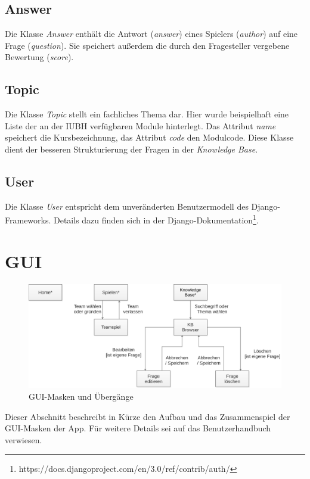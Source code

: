 \documentclass[a4paper,11pt,listof=numbered,glossary=totoc,parskip=half,toc=bib]{scrreprt}
\begin{document}
	\subsection{Answer}
	Die Klasse \textit{Answer} enthält die Antwort (\textit{answer}) eines Spielers (\textit{author}) auf eine Frage (\textit{question}). Sie speichert außerdem die durch den Fragesteller vergebene Bewertung (\textit{score}).
	
	\subsection{Topic}
	Die Klasse \textit{Topic} stellt ein fachliches Thema dar. Hier wurde beispielhaft eine Liste der an der IUBH verfügbaren Module hinterlegt. Das Attribut \textit{name} speichert die Kursbezeichnung, das Attribut \textit{code} den Modulcode. Diese Klasse dient der besseren Strukturierung der Fragen in der \textit{Knowledge Base}.

	\subsection{User}
	Die Klasse \textit{User} entspricht dem unveränderten Benutzermodell des Django-Frameworks. Details dazu finden sich in der Django-Dokumentation\footnote{https://docs.djangoproject.com/en/3.0/ref/contrib/auth/}.	
	
	\section{GUI}
	
	\begin{figure}
		\centering
		\includegraphics[width=\textwidth]{gui.png}
		\caption{GUI-Masken und Übergänge}
		\label{fig:gui}
	\end{figure}
	
	Dieser Abschnitt beschreibt in Kürze den Aufbau und das Zusammenspiel der GUI-Masken der App. Für weitere Details sei auf das Benutzerhandbuch verwiesen.
	
\end{document}
